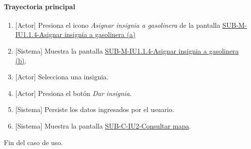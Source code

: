 \paragraph{Trayectoria principal}
	\begin{enumerate}
		\item {[Actor]} Presiona el icono \textit{Asignar insignia a gasolinera} de la pantalla \hyperref[fig:sub-m-iu1.1.4.a]{SUB-M-IU1.1.4-Asignar insignia a gasolinera (a)}
		\item {[Sistema]} Muestra la pantalla \hyperref[fig:sub-m-iu1.1.4.b]{SUB-M-IU1.1.4-Asignar insignia a gasolinera (b)}.
		\item {[Actor]} Selecciona una insignia.
		\item {[Actor]} Presiona el botón \textit{Dar insignia}.
		\item {[Sistema]} Persiste los datos ingresados por el usuario.
		\item {[Sistema]} Muestra la pantalla \hyperref[fig:sub-c-iu2]{SUB-C-IU2-Consultar mapa}.
	\end{enumerate}
	Fin del caso de uso.